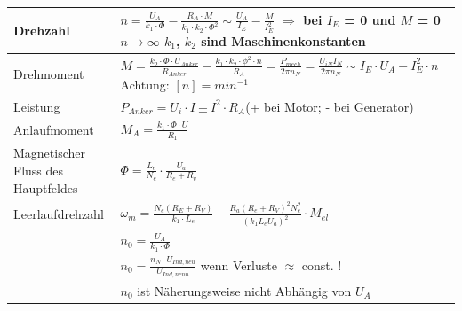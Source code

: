     	
        \renewcommand{\arraystretch}{1.5}
        \begin{tabular}[c]{ | p{6cm} | p{11cm} |}
            \hline
            Drehzahl &
            $ n= \frac{U_A}{k_1 \cdot \Phi} - \frac{R_A \cdot M}{k_1 \cdot k_2 \cdot \Phi^2} \sim \frac{U_A}{I_E} - \frac{M}{I_E^2}$ \newline
            $\Longrightarrow $ bei $I_E$ = 0 und $M$ = 0 $n \rightarrow \infty$ \newline 
            $k_1$, $k_2$ sind Maschinenkonstanten \\
            \hline
            Drehmoment &
            $M=\frac{k_2 \cdot \Phi \cdot U_{Anker}}{R_{Anker}} - \frac{k_1 \cdot k_2 \cdot\phi^2 \cdot n}{R_A} =\frac{P_{mech}}{2\pi n_N}=\frac{U_{iN}I_N}{2\pi n_N}\sim I_E \cdot U_A - I_E ^2 \cdot n$
            \quad Achtung: $[n] = min^{-1}$\\
            \hline
            Leistung &
            $P_{Anker}= U_i \cdot I \pm I^2 \cdot R_A $(+ bei Motor; - bei Generator) \\
            \hline
            Anlaufmoment &
            $M_A = \frac{k_1 \cdot \Phi \cdot U}{R_1}$ \\
            \hline
            Magnetischer Fluss des Hauptfeldes & 
            $\Phi=\frac{L_e}{N_e}\cdot\frac{U_a}{R_e+R_v}$\\
            \hline
            Leerlaufdrehzahl &
            $\omega_m=\frac{N_e\left(R_E+R_V\right)}{k_1\cdot
            L_e}-\frac{R_a\left(R_e+R_V\right)^2N_e^2}{\left(k_1L_eU_a\right)^2}\cdot
            M_{el}$\\
            & $n_0 = \frac{U_A}{k_1 \cdot \Phi}$ \\
            & $n_0 = \frac{n_N \cdot U_{Ind,neu}}{U_{Ind,nenn}}$  wenn Verluste $ \approx$ const. !\\
            & $n_0$ ist Näherungsweise nicht Abhängig von $U_A$ \\
            \hline
            
        \end{tabular}
        \renewcommand{\arraystretch}{1.3}
        
